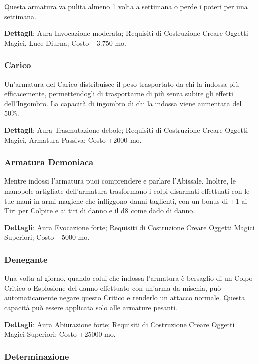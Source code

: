 \begin{multicols}{2}
	Questa armatura va pulita almeno 1 volta a settimana o perde i poteri per una settimana.

	\textbf{Dettagli}: Aura Invocazione moderata; Requisiti di Costruzione Creare Oggetti Magici, Luce Diurna; Costo +3.750 mo.

	\subsubsection*{Carico}

	Un'armatura del Carico distribuisce il peso trasportato da chi la indossa più efficacemente, permettendogli di trasportarne di più senza subire gli effetti dell'Ingombro. La capacità di ingombro di chi la indossa viene aumentata del 50\%.

	\textbf{Dettagli}: Aura Trasmutazione debole; Requisiti di Costruzione Creare Oggetti Magici, Armatura Passiva; Costo +2000 mo.

	\subsubsection*{Armatura Demoniaca}

	Mentre indossi l'armatura puoi comprendere e parlare l'Abissale. Inoltre, le manopole artigliate dell'armatura trasformano i colpi disarmati effettuati con le tue mani in armi magiche che infliggono danni taglienti, con un bonus di +1 ai Tiri per Colpire e ai tiri di danno e il d8 come dado di danno.

	\textbf{Dettagli}: Aura Evocazione forte; Requisiti di Costruzione Creare Oggetti Magici Superiori; Costo +5000 mo.

	\subsubsection*{Denegante}

	Una volta al giorno, quando colui che indossa l'armatura è bersaglio di un Colpo Critico o Esplosione del danno effettuato con un'arma da mischia, può automaticamente negare questo Critico e renderlo un attacco normale. Questa capacità può essere applicata solo alle armature pesanti.

	\textbf{Dettagli}: Aura Abiurazione forte; Requisiti di Costruzione Creare Oggetti Magici Superiori; Costo +25000 mo.

	\subsubsection*{Determinazione}


\end{multicols}
